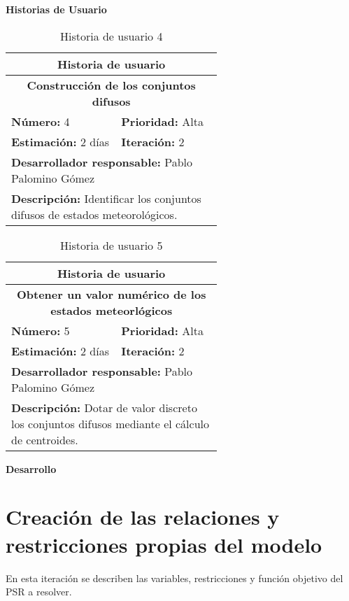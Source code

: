 \textbf{Historias de Usuario}\\

\begin{table}[H]
        \centering
        \begin{tabular}{|p{0.3\linewidth}|p{0.3\linewidth}|}
          \hline
          \multicolumn{2}{|c|}{Historia de usuario}\\ \hline
          \multicolumn{2}{|c|}{\textbf{Construcción de los conjuntos difusos}}\\ \hline
          \textbf{Número:} 4 & \textbf{Prioridad:} Alta\\ \hline
          \textbf{Estimación:} 2 días & \textbf{Iteración:} 2\\ \hline
          \multicolumn{2}{|l|}{\textbf{Desarrollador responsable:} Pablo Palomino Gómez}\\ \hline
          \multicolumn{2}{|p{0.6\linewidth}|}{\textbf{Descripción:} Identificar los conjuntos difusos de estados meteorológicos.}\\ \hline
        \end{tabular}
        \caption{Historia de usuario 4}
        \label{tab:hist4}
\end{table}
\begin{table}[H]
        \centering
        \begin{tabular}{|p{0.3\linewidth}|p{0.3\linewidth}|}
          \hline
          \multicolumn{2}{|c|}{Historia de usuario}\\ \hline
          \multicolumn{2}{|c|}{\textbf{Obtener un valor numérico de los estados meteorlógicos}}\\ \hline
          \textbf{Número:} 5 & \textbf{Prioridad:} Alta\\ \hline
          \textbf{Estimación:} 2 días & \textbf{Iteración:} 2\\ \hline
          \multicolumn{2}{|l|}{\textbf{Desarrollador responsable:} Pablo Palomino Gómez}\\ \hline
          \multicolumn{2}{|p{0.6\linewidth}|}{\textbf{Descripción:} Dotar de valor discreto los conjuntos difusos mediante el cálculo de centroides.}\\ \hline
        \end{tabular}
        \caption{Historia de usuario 5}
        \label{tab:hist5}
\end{table}
\textbf{Desarrollo}\\


\section{Creación de las relaciones y restricciones propias del modelo}
\label{sec:hito3}
En esta iteración se describen las variables, restricciones y función objetivo del \gls{PSR} a resolver.\\

